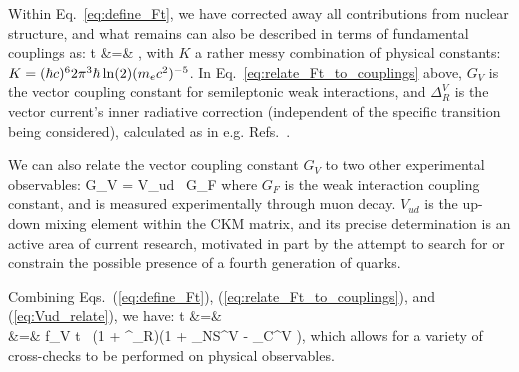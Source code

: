 Within Eq.~\ref{eq:define_Ft}, we have corrected away all contributions from nuclear structure, and what remains can also be described in terms of fundamental couplings as:
\bea
{}t &=& ,
\label{eq:relate_Ft_to_couplings}
\eea
with $K$ a rather messy combination of physical constants: $K = (\hbar c)^6 2\pi^3 \hbar \ln(2) (m_e c^2)^{-5}$.  
%
In Eq.~\ref{eq:relate_Ft_to_couplings} above, $G_V$ is the vector coupling constant for semileptonic weak interactions, and $\Delta_R^{V}$ is the vector current's inner radiative correction (independent of the specific transition being considered), calculated as in e.g. Refs.~\cite{MarcianoSirlin_1986}\cite{MarcianoSirlin_2006}\cite{CzarneckiMarcianoSirlin_2019}.  %

We can also relate the vector coupling constant $G_V$ to two other experimental observables:
\bea
G_V = V_{ud}  \, G_F
\label{eq:Vud_relate}
\eea
where $G_F$ is the weak interaction coupling constant, and is measured experimentally through muon decay.  
$V_{ud}$ is the up-down mixing element within the \ac{CKM} matrix, and its precise determination is an active area of current research, motivated in part by the attempt to search for or constrain the possible presence of a fourth generation of quarks. 
\color{black}

\color{skyblue}
Combining Eqs.~(\ref{eq:define_Ft}), (\ref{eq:relate_Ft_to_couplings}), and (\ref{eq:Vud_relate}), we have:
\bea
{}t &=&  
\nonumber \\
&=& 
f_V t \, (1 + \delta^\prime_R)(1 + \delta_{NS}^V - \delta_C^{V} ), 
\eea
which allows for a variety of cross-checks to be performed on physical observables.  
\color{black}

